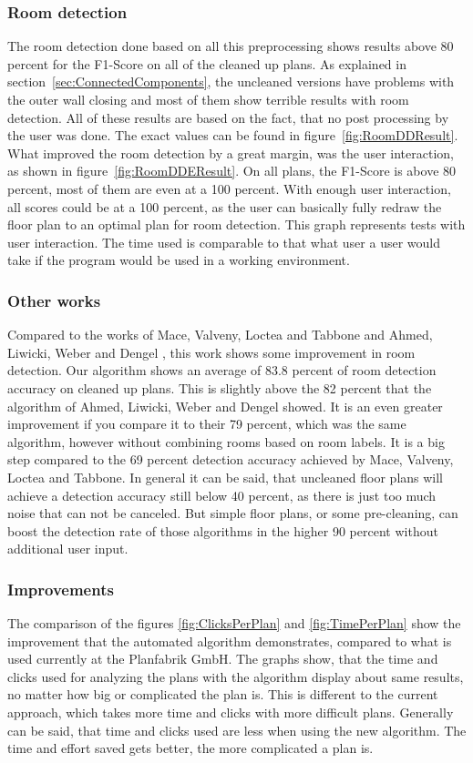 \subsubsection{Room detection}
The room detection done based on all this preprocessing shows results above 80 percent for the F1-Score on all of the cleaned up plans. As explained in section~\ref{sec:ConnectedComponents}, the uncleaned versions have problems with the outer wall closing and most of them show terrible results with room detection. All of these results are based on the fact, that no post processing by the user was done. The exact values can be found in figure~\ref{fig:RoomDDResult}. What improved the room detection by a great margin, was the user interaction, as shown in figure~\ref{fig:RoomDDEResult}. On all plans, the F1-Score is above 80 percent, most of them are even at a 100 percent. With enough user interaction, all scores could be at a 100 percent, as the user can basically fully redraw the floor plan to an optimal plan for room detection. This graph represents tests with user interaction. The time used is comparable to that what user a user would take if the program would be used in a working environment.

\subsubsection{Other works}
Compared to the works of Mace, Valveny, Loctea and Tabbone \citep{mace_valveny_loctea_tabbone_2010} and Ahmed, Liwicki, Weber and Dengel \citep{ahmed_liwicki_weber_dengel_2012}, this work shows some improvement in room detection. Our algorithm shows an average of 83.8 percent of room detection accuracy on cleaned up plans. This is slightly above the 82 percent that the algorithm of Ahmed, Liwicki, Weber and Dengel showed. It is an even greater improvement if you compare it to their 79 percent, which was the same algorithm, however without combining rooms based on room labels. It is a big step compared to the 69 percent detection accuracy achieved by Mace, Valveny, Loctea and Tabbone. In general it can be said, that uncleaned floor plans will achieve a detection accuracy still below 40 percent, as there is just too much noise that can not be canceled. But simple floor plans, or some pre-cleaning, can boost the detection rate of those algorithms in the higher 90 percent without additional user input. 

\subsubsection{Improvements}
The comparison of the figures \ref{fig:ClicksPerPlan} and \ref{fig:TimePerPlan} show the improvement that the automated algorithm demonstrates, compared to what is used currently at the Planfabrik GmbH. The graphs show, that the time and clicks used for analyzing the plans with the algorithm display about same results, no matter how big or complicated the plan is. This is different to the current approach, which takes more time and clicks with more difficult plans. Generally can be said, that time and clicks used are less when using the new algorithm. The time and effort saved gets better, the more complicated a plan is. 

